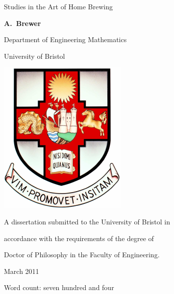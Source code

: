 %
%
%
%
%
\begin{titlepage}
  \vspace*{15mm}
  \begin{center}
  {\huge
    Studies in the Art of
    \vspace{2mm}
    Home Brewing
  }
  \vspace{15mm}

  \textbf{\large A.\ Brewer}

  Department of Engineering Mathematics

  University of Bristol
  \vspace{15mm}

  \includegraphics{logos/bristolcrest_colour}
  \vspace{20mm}

  A dissertation submitted to the University of Bristol in

  accordance with the requirements of the degree of

  Doctor of Philosophy in the Faculty of Engineering.
  \vspace{10mm}

  March 2011
    \vspace{10mm}

    \footnotesize{Word count: seven hundred and four}

  \end{center}
\end{titlepage}

